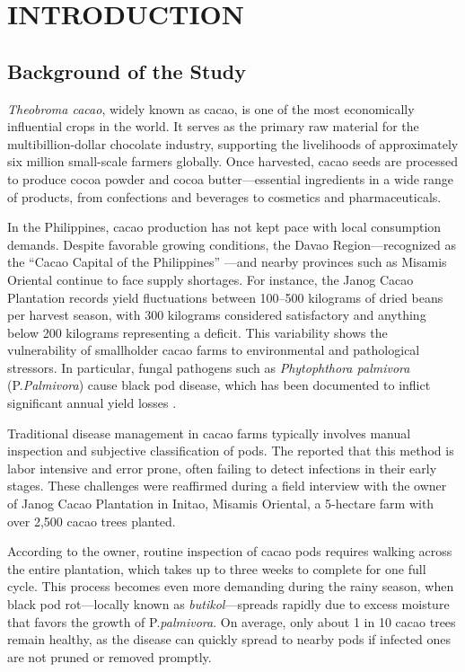 \chapter{INTRODUCTION}

{\baselineskip

	\section{Background of the Study}
\textit{Theobroma cacao}, widely known as cacao, is one of the most economically influential crops in the world. It serves as the primary raw material for the multibillion-dollar chocolate industry, supporting the livelihoods of approximately six million small-scale farmers globally. Once harvested, cacao seeds are processed to produce cocoa powder and cocoa butter—essential ingredients in a wide range of products, from confections and beverages to cosmetics and pharmaceuticals.

In the Philippines, cacao production has not kept pace with local consumption demands. Despite favorable growing conditions, the Davao Region—recognized as the “Cacao Capital of the Philippines” \cite{PCAF2021}—and nearby provinces such as Misamis Oriental continue to face supply shortages. For instance, the Janog Cacao Plantation records yield fluctuations between 100–500 kilograms of dried beans per harvest season, with 300 kilograms considered satisfactory and anything below 200 kilograms representing a deficit. This variability shows the vulnerability of smallholder cacao farms to environmental and pathological stressors. In particular, fungal pathogens such as \textit{Phytophthora palmivora} (P.\textit{Palmivora}) cause black pod disease, which has been documented to inflict significant annual yield losses \cite{Avila2023}.

Traditional disease management in cacao farms typically involves manual inspection and subjective classification of pods. The \cite{PhilCacaoRoadmap2021} reported that this method is labor intensive and error prone, often failing to detect infections in their early stages. These challenges were reaffirmed during a field interview with the owner of Janog Cacao Plantation in Initao, Misamis Oriental, a 5-hectare farm with over 2,500 cacao trees planted.

According to the owner, routine inspection of cacao pods requires walking across the entire plantation, which takes up to three weeks to complete for one full cycle. This process becomes even more demanding during the rainy season, when black pod rot—locally known as \textit{butikol}—spreads rapidly due to excess moisture that favors the growth of P.\textit{palmivora}. On average, only about 1 in 10 cacao trees remain healthy, as the disease can quickly spread to nearby pods if infected ones are not pruned or removed promptly. 

}
